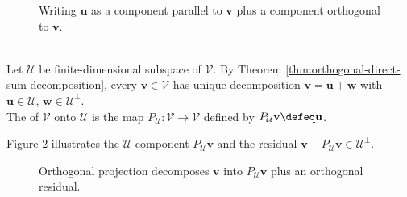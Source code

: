 \begin{figure}[H]
  \centering
  
  \caption{Writing $\mathbf{u}$ as a component parallel to $\mathbf{v}$ plus a component orthogonal to $\mathbf{v}$.}
  \label{fig:orthogonal-decomposition-one-vector}
\end{figure}

\begin{definition} \label{def:orthogonal-projection-subspace} \\
Let $\mathcal{U}$ be finite-dimensional subspace of $\mathcal{V}$. By Theorem \ref{thm:orthogonal-direct-sum-decomposition}, every $\mathbf{v}\in\mathcal{V}$ has unique decomposition $\mathbf{v}=\mathbf{u}+\mathbf{w}$ with $\mathbf{u}\in\mathcal{U}$, $\mathbf{w}\in\mathcal{U}^{\perp}$.\\
The  of $\mathcal{V}$ onto $\mathcal{U}$ is the map $P_{\mathcal{U}}:\mathcal{V}\to\mathcal{V}$ defined by $P_{\mathcal{U}}\mathbf{v}\defeq\mathbf{u}$.
\end{definition}

\par Figure \ref{fig:orthogonal-projection-subspace} illustrates the $\mathcal{U}$-component $P_{\mathcal{U}}\mathbf{v}$ and the residual $\mathbf{v}-P_{\mathcal{U}}\mathbf{v}\in\mathcal{U}^{\perp}$.

\begin{figure}[H]
  \centering
  
  \caption{Orthogonal projection decomposes $\mathbf{v}$ into $P_{\mathcal{U}}\mathbf{v}$ plus an orthogonal residual.}
  \label{fig:orthogonal-projection-subspace}
\end{figure}

